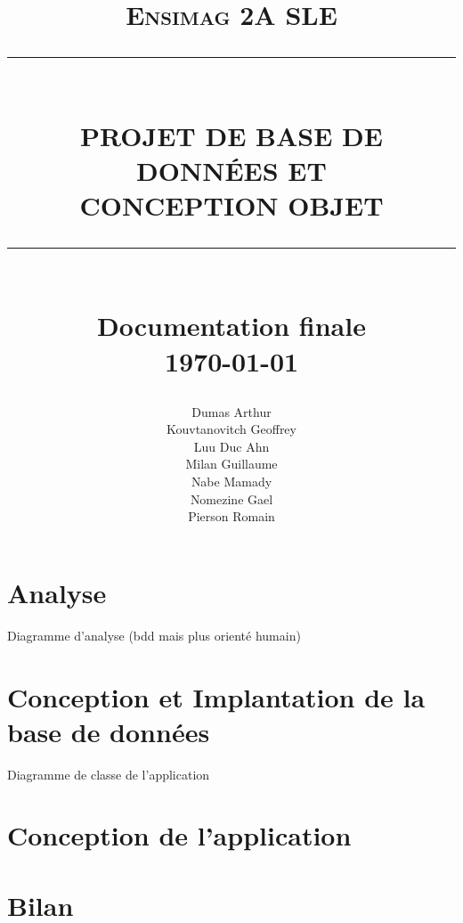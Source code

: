 \documentclass[a4paper, 11pt]{article}
\newcommand{\HRule}[1]{\rule{\linewidth}{#1}}
\begin{document}
\title{ \vspace{3cm}
		\normalsize \textsc{Ensimag 2A SLE}
		\\ [3.0cm]
		\HRule{0.5pt} \\
		\LARGE \textbf{\uppercase{Projet de Base de Données et\\ Conception Objet}}
		\HRule{2pt} \\ [0.5cm]
        \large{Documentation finale} \\ [1cm]
		\normalsize \today \vspace*{6\baselineskip}}	
        
\author{Dumas Arthur \\ Kouvtanovitch Geoffrey \\ Luu Duc Ahn \\ Milan Guillaume \\ Nabe Mamady \\ Nomezine Gael \\ Pierson Romain}
\date{}   

\maketitle
        
	\newpage	
	\renewcommand{\contentsname}{Sommaire}
	\tableofcontents
	\newpage
	
\section{Analyse}
	Diagramme d'analyse (bdd mais plus orienté humain)

\section{Conception et Implantation de la base de données}
	Diagramme de classe de l'application



\section{Conception de l'application}

	
\section{Bilan}
        
\end{document}
